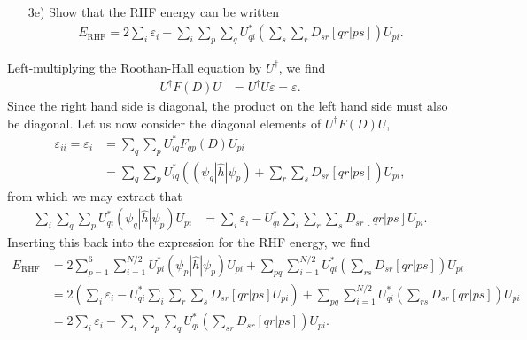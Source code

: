 \documentclass[a4paper]{article}
\newcommand{\nn}{\nonumber}
\begin{document}
\begin{exframe}
\begin{itemize}
  \item[3e)] Show that the RHF energy can be written 
  \begin{align}
  E_\text{RHF} = 2\sum_i\varepsilon_i - \sum_i\sum_p\sum_q U_{qi}^*\left(\sum_s\sum_r D_{sr}[qr|ps] \right)U_{pi}.
  \end{align}
\end{itemize}
\end{exframe}
Left-multiplying the Roothan-Hall equation by $U^\dagger$, we find
\begin{align}
U^\dagger F(D)U &= U^\dagger U\varepsilon = \varepsilon.
\end{align}
Since the right hand side is diagonal, the product on the left hand side must also be diagonal. Let us now consider the diagonal elements of $U^\dagger F(D) U$,
\begin{align}
\varepsilon_{ii} = \varepsilon_i &= \sum_q\sum_p U^*_{iq}F_{qp}(D)U_{pi} \nn\\
&= \sum_q\sum_p U^*_{iq}\left((\psi_q | \hat{h} | \psi_p) + \sum_r \sum_s D_{sr}[qr|ps] \right)U_{pi},
\end{align}
from which we may extract that
\begin{align}
\sum_i\sum_q\sum_p U^*_{qi}(\psi_q|\hat{h}|\psi_p)U_{pi} &= \sum_i \varepsilon_i - U^*_{qi}\sum_i\sum_r\sum_s D_{sr}[qr|ps] U_{pi}.
\end{align}
Inserting this back into the expression for the RHF energy, we find
\begin{align}
E_\text{RHF} &= 2\sum_{p=1}^6 \sum_{i=1}^{N/2} U^*_{pi}({\psi}_p | \hat{h} | {\psi}_p)U_{pi} + \sum_{pq}\sum_{i=1}^{N/2} U^*_{qi} \left(\sum_{rs}D_{sr} [qr|ps]\right) U_{pi} \nn\\
&= 2\left(\sum_i \varepsilon_i - U^*_{qi}\sum_i\sum_r\sum_s D_{sr}[qr|ps] U_{pi} \right)+ \sum_{pq}\sum_{i=1}^{N/2} U^*_{qi} \left(\sum_{rs}D_{sr} [qr|ps]\right) U_{pi} \nn\\
&= 2\sum_i\varepsilon_i - \sum_i\sum_p\sum_q U^*_{qi}\left( \sum_{sr} D_{sr}[qr|ps]\right) U_{pi}.
\end{align}
\end{document}
